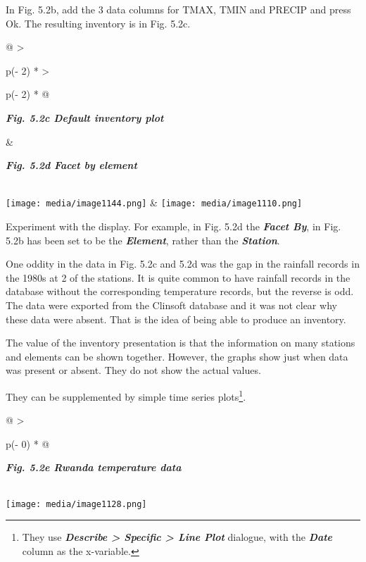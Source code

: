 \documentclass[
  letterpaper,
  DIV=11,
  numbers=noendperiod]{scrreprt}
\begin{document}
In Fig. 5.2b, add the 3 data columns for TMAX, TMIN and PRECIP and press
Ok. The resulting inventory is in Fig. 5.2c.

\begin{longtable}[]{@{}
  >{\raggedright\arraybackslash}p{(\columnwidth - 2\tabcolsep) * }
  >{\raggedright\arraybackslash}p{(\columnwidth - 2\tabcolsep) * }@{}}
\toprule\noalign{}
\begin{minipage}[b]{\linewidth}\raggedright
\textbf{\emph{Fig. 5.2c Default inventory plot}}
\end{minipage} & \begin{minipage}[b]{\linewidth}\raggedright
\textbf{\emph{Fig. 5.2d Facet by element}}
\end{minipage} \\
\midrule\noalign{}
\endhead
\bottomrule\noalign{}
\endlastfoot
\texttt{[image: media/image1144.png]}
&
\texttt{[image: media/image1110.png]} \\
\end{longtable}

Experiment with the display. For example, in Fig. 5.2d the
\textbf{\emph{Facet By}}, in Fig. 5.2b has been set to be the
\textbf{\emph{Element}}, rather than the \textbf{\emph{Station}}.

One oddity in the data in Fig. 5.2c and 5.2d was the gap in the rainfall
records in the 1980s at 2 of the stations. It is quite common to have
rainfall records in the database without the corresponding temperature
records, but the reverse is odd. The data were exported from the
Clinsoft database and it was not clear why these data were absent. That
is the idea of being able to produce an inventory.

The value of the inventory presentation is that the information on many
stations and elements can be shown together. However, the graphs show
just when data was present or absent. They do not show the actual
values.

They can be supplemented by simple time series plots\footnote{They use
  \textbf{\emph{Describe \textgreater{} Specific \textgreater{} Line
  Plot}} dialogue, with the \textbf{\emph{Date}} column as the
  x-variable.}.

\begin{longtable}[]{@{}
  >{\raggedright\arraybackslash}p{(\columnwidth - 0\tabcolsep) * }@{}}
\toprule\noalign{}
\begin{minipage}[b]{\linewidth}\raggedright
\textbf{\emph{Fig. 5.2e Rwanda temperature data}}
\end{minipage} \\
\midrule\noalign{}
\endhead
\bottomrule\noalign{}
\endlastfoot
\texttt{[image: media/image1128.png]} \\
\end{longtable}
\end{document}

